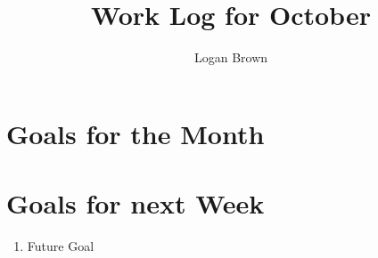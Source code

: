 

\title{Work Log for October}
\author{Logan Brown}


\maketitle


\section{Goals for the Month}



\section{Goals for next Week}
\begin{enumerate}
\item Future Goal
\end{enumerate}


